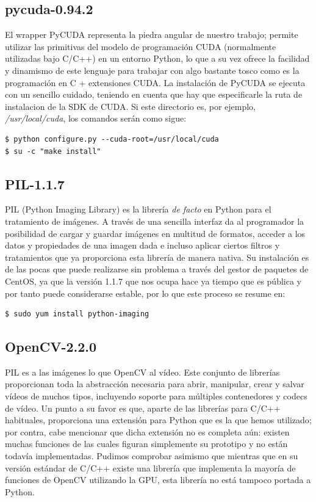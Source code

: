 \documentclass[twoside]{article}
\begin{document}
\subsection{pycuda-0.94.2}

El wrapper PyCUDA representa la piedra angular de nuestro trabajo; permite utilizar las primitivas del modelo de programación CUDA (normalmente utilizadas bajo C/C++) en un entorno Python, lo que a su vez ofrece la facilidad y dinamismo de este lenguaje para trabajar con algo bastante tosco como es la programación en C + extensiones CUDA. La instalación de PyCUDA se ejecuta con un sencillo cuidado, teniendo en cuenta que hay que especificarle la ruta de instalacion de la SDK de CUDA. Si este directorio es, por ejemplo, \emph{/usr/local/cuda}, los comandos serán como sigue:

\begin{verbatim}
$ python configure.py --cuda-root=/usr/local/cuda
$ su -c "make install"
\end{verbatim}

\subsection{PIL-1.1.7}

PIL (Python Imaging Library) es la librería \emph{de facto} en Python para el tratamiento de imágenes. A través de una sencilla interfaz da al programador la posibilidad de cargar y guardar imágenes en multitud de formatos, acceder a los datos y propiedades de una imagen dada e incluso aplicar ciertos filtros y tratamientos que ya proporciona esta librería de manera nativa. Su instalación es de las pocas que puede realizarse sin problema a través del gestor de paquetes de CentOS, ya que la versión 1.1.7 que nos ocupa hace ya tiempo que es pública y por tanto puede considerarse estable, por lo que este proceso se resume en: 

\begin{verbatim}
$ sudo yum install python-imaging
\end{verbatim}

\subsection{OpenCV-2.2.0}

PIL es a las imágenes lo que OpenCV al vídeo. Este conjunto de librerías proporcionan toda la abstracción necesaria para abrir, manipular, crear y salvar vídeos de muchos tipos, incluyendo soporte para múltiples contenedores y codecs de vídeo. Un punto a su favor es que, aparte de las librerías para C/C++ habituales, proporciona una extensión para Python que es la que hemos utilizado; por contra, cabe mencionar que dicha extensión no es completa aún: existen muchas funciones de las cuales figuran simplemente su prototipo y no están todavía implementadas. Pudimos comprobar asimismo que mientras que en su versión estándar de C/C++ existe una librería que implementa la mayoría de funciones de OpenCV utilizando la GPU, esta librería no está tampoco portada a Python.
\end{document}
